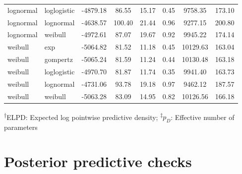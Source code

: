 \documentclass[AMA,STIX1COL]{WileyNJD-v2}
\begin{document}
\begin{table}[H]
\begin{tabular}{l l c c c c c c}
lognormal & loglogistic & -4879.18 & 86.55 & 15.17 & 0.45 & 9758.35 & 173.10\\
lognormal & lognormal & -4638.57 & 100.40 & 21.44 & 0.96 & 9277.15 & 200.80\\
lognormal & weibull & -4972.61 & 87.07 & 19.67 & 0.92 & 9945.22 & 174.14\\
weibull & exp & -5064.82 & 81.52 & 11.18 & 0.45 & 10129.63 & 163.04\\
weibull & gompertz & -5065.24 & 81.59 & 11.24 & 0.44 & 10130.48 & 163.18\\
weibull & loglogistic & -4970.70 & 81.87 & 11.74 & 0.35 & 9941.40 & 163.73\\
weibull & lognormal & -4731.06 & 93.78 & 19.18 & 0.97 & 9462.12 & 187.57\\
weibull & weibull & -5063.28 & 83.09 & 14.95 & 0.82 & 10126.56 & 166.18\\
\bottomrule
\end{tabular}
\begin{tablenotes}%
\textsuperscript{$\dagger$}ELPD: Expected log pointwise predictive density;
\textsuperscript{$\ddagger$}$p_D$: Effective number of parameters
\end{tablenotes}
\end{table}

\section{Posterior predictive checks}
\end{document}

